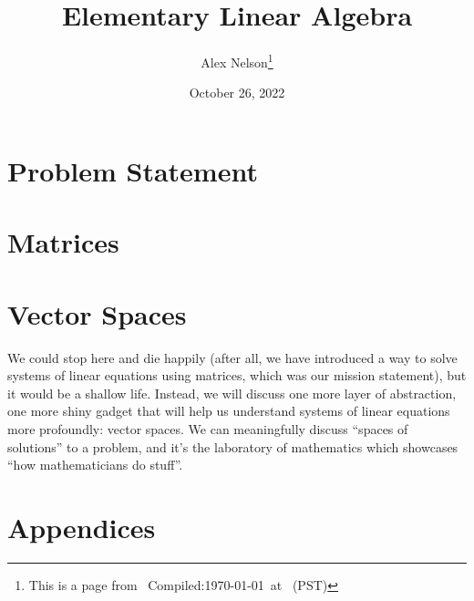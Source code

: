 \documentclass{article}
\title{Elementary Linear Algebra}
\author{Alex Nelson\thanks{This is a page from \homeurl{}\hfil\break\indent\;\, Compiled:\enspace\today\ at \currenttime\ (PST)}}
\date{October 26, 2022}
\begin{document}
\maketitle

\tableofcontents


\part{Problem Statement}

\part{Matrices}\label{part:matrices}




% 

\vfill\eject
\part{Vector Spaces}

We could stop here and die happily (after all, we have introduced a way
to solve systems of linear equations using matrices, which was our
mission statement), but it would be a shallow
life. Instead, we will discuss one more layer of abstraction, one more
shiny gadget that will help us understand systems of linear equations
more profoundly: vector spaces. We can meaningfully discuss ``spaces of
solutions'' to a problem, and it's the laboratory of mathematics which
showcases ``how mathematicians do stuff''.








\vfill\eject
\part{Appendices}
\appendix
%
\vfill\eject

\end{document}
